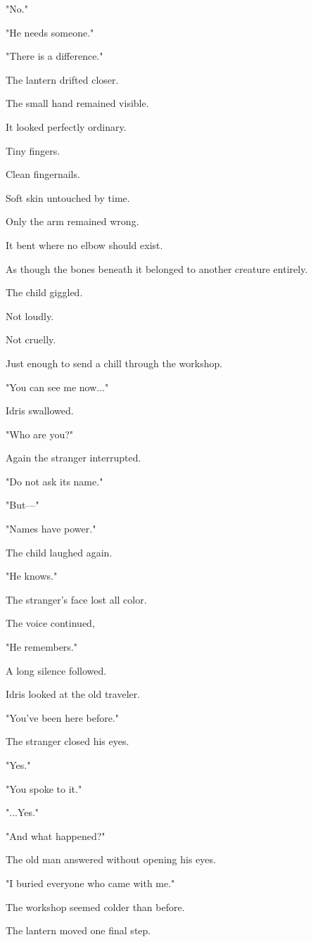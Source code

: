 \documentclass[12pt,openany]{book}
\begin{document}
"No."

"He needs someone."

"There is a difference."

The lantern drifted closer.

The small hand remained visible.

It looked perfectly ordinary.

Tiny fingers.

Clean fingernails.

Soft skin untouched by time.

Only the arm remained wrong.

It bent where no elbow should exist.

As though the bones beneath it belonged to another creature entirely.

The child giggled.

Not loudly.

Not cruelly.

Just enough to send a chill through the workshop.

"You can see me now..."

Idris swallowed.

"Who are you?"

Again the stranger interrupted.

"Do not ask its name."

"But—"

"Names have power."

The child laughed again.

"He knows."

The stranger's face lost all color.

The voice continued,

"He remembers."

A long silence followed.

Idris looked at the old traveler.

"You've been here before."

The stranger closed his eyes.

"Yes."

"You spoke to it."

"...Yes."

"And what happened?"

The old man answered without opening his eyes.

"I buried everyone who came with me."

The workshop seemed colder than before.

The lantern moved one final step.
\end{document}
